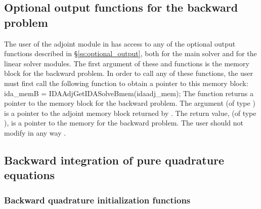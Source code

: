 \subsection{Optional output functions for the backward problem}
\label{ss:optional_output_B}
The user of the adjoint module in {\idas} has access to any of the optional output 
functions described in \S\ref{ss:optional_output}, both for the main solver and for
the linear solver modules. The first argument of these  and 
functions is the {\idas} memory block for the backward problem. In order to call any of these
functions, the user must first call the following function to obtain a pointer to
this memory block:
{
  ida\_memB = IDAAdjGetIDASolveBmem(idaadj\_mem);
}
{
  The function  returns a pointer to the {\idas}
  memory block for the backward problem.
}
{
  The argument  (of type ) is a pointer to the
  adjoint memory block returned by .
}
{
  The return value,  (of type ), is a pointer to the
  {\idas} memory for the backward problem.
}
{
  {\warn}The user should not modify in any way .
}

\subsection{Backward integration of pure quadrature equations}


\subsubsection{Backward quadrature initialization functions}\label{sss:idaquadmallocb}

